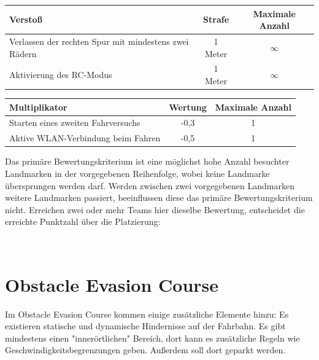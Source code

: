 \documentclass[a4paper, 11pt,usegeometry]{scrartcl}
\begin{document}
\begin{table}[H]
\begin{tabular}{|p{}|c|c|}
\hline
\rowcolor[HTML]{CACACA}
\textbf{Verstoß}                                  & \textbf{Strafe} & \textbf{Maximale Anzahl} \\ \hline
Verlassen der rechten Spur mit mindestens zwei Rädern & 1 Meter         & $\infty$                 \\ \hline
Aktivierung des RC-Modus                          & 1 Meter         & $\infty$                 \\ \hline
\end{tabular}
\end{table}
\begin{table}[H]
\begin{tabular}{|p{}|c|c|}
\hline
\rowcolor[HTML]{CACACA}
\textbf{Multiplikator}             & \textbf{Wertung} & \textbf{Maximale Anzahl} \\ \hline
Starten eines zweiten Fahrversuchs & -0,3             & 1                  \\ \hline
Aktive WLAN-Verbindung beim Fahren & -0,5             & 1                   \\ \hline
\end{tabular}
\end{table}

Das primäre Bewertungskriterium ist eine möglichst hohe Anzahl besuchter Landmarken in der vorgegebenen Reihenfolge,
wobei keine Landmarke übersprungen werden darf. Werden zwischen zwei vorgegebenen Landmarken weitere Landmarken
passiert, beeinflussen diese das primäre Bewertungskriterium nicht. Erreichen zwei oder mehr Teams hier dieselbe
Bewertung, entscheidet die erreichte Punktzahl über die Platzierung:

\



\section*{Obstacle Evasion Course}
Im Obstacle Evasion Course kommen einige zusätzliche Elemente hinzu: Es existieren
statische und dynamische Hindernisse auf der Fahrbahn.
Es gibt mindestens einen "innerörtlichen" Bereich, dort kann es zusätzliche 
Regeln wie Geschwindigkeitsbegrenzungen geben.
Außerdem soll dort geparkt werden.\\
\end{document}
